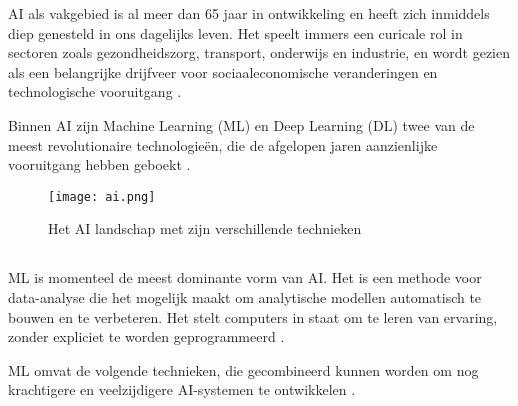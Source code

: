 \medskip

AI als vakgebied is al meer dan 65 jaar in ontwikkeling en heeft zich inmiddels diep genesteld in ons dagelijks leven. Het speelt immers een curicale rol in sectoren zoals gezondheidszorg, transport, onderwijs en industrie, en wordt gezien als een belangrijke drijfveer voor sociaaleconomische veranderingen en technologische vooruitgang \autocite{JiangEtAl2022}.

\medskip

Binnen AI zijn Machine Learning (ML) en Deep Learning (DL) twee van de meest revolutionaire technologieën, die de afgelopen jaren aanzienlijke vooruitgang hebben geboekt \autocite{SharifaniEtAl2023}.

\begin{figure}
  \centering
  \texttt{[image: ai.png]}
  \caption[Figuur 1]{\label{fig:ai}Het AI landschap met zijn verschillende technieken \autocite{Kouassi2023}}
\end{figure}

\subsection{}%
\label{subsec:machine-learning}

ML is momenteel de meest dominante vorm van AI. Het is een methode voor data-analyse die het mogelijk maakt om analytische modellen automatisch te bouwen en te verbeteren. Het stelt computers in staat om te leren van ervaring, zonder expliciet te worden geprogrammeerd \autocite{SharifaniEtAl2023}.

\medskip

ML omvat de volgende technieken, die gecombineerd kunnen worden om nog krachtigere en veelzijdigere AI-systemen te ontwikkelen \autocite{Kouassi2023}. 

